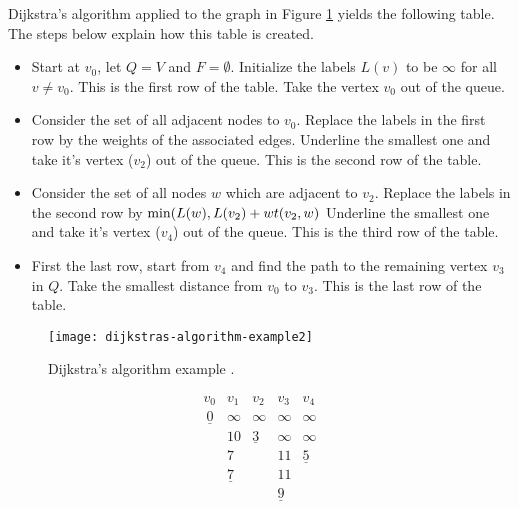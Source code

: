 \begin{example}
{\rm
Dijkstra's algorithm applied to the graph in Figure
\ref{fig:dijkstras-algorithm-example2} yields the following
table. The steps below explain how this table is created.

\begin{itemize}
\item
Start at $v_0$, let $Q=V$ and $F=\emptyset$.
Initialize the labels $L(v)$ to be $\infty$ for all
$v\not= v_0$. This is the first row of the table.
Take the vertex $v_0$ out of the queue.

\item
Consider the set of all adjacent nodes to $v_0$.
Replace the labels in the first row by the weights
of the associated edges.
Underline the smallest one and take it's vertex
($v_2$) out of the queue.
This is the second row of the table.

\item
Consider the set of all nodes $w$ which are adjacent 
to $v_2$. Replace the labels in the second row by 
${\rm min}(L(w),L(v_2)+wt(v_2,w)$
Underline the smallest one and take it's vertex
($v_4$) out of the queue.
This is the third row of the table.

\item
First the last row, start from $v_4$ and find 
the path to the remaining vertex $v_3$ in $Q$.
Take the smallest distance from $v_0$ to $v_3$.
This is the last row of the table.

\end{itemize}




\begin{figure}[h!]
\begin{center}
\texttt{[image: dijkstras-algorithm-example2]}
\end{center}
\caption{Dijkstra's algorithm example . }
\label{fig:dijkstras-algorithm-example2}
\end{figure}


\[
\begin{array}{ccccc}
v_0  & v_1  & v_2     &  v_3     & v_4  \\\
\underline{0}    & \infty & \infty & \infty & \infty \\
      & 10      & \underline{3}        & \infty & \infty \\
      &  7       &            &  11     & \underline{5}       \\
      &  \underline{7}       &            &  11     &         \\
      &          &            &   \underline{9}     &         \\
\end{array}
\]

}
\end{example}

